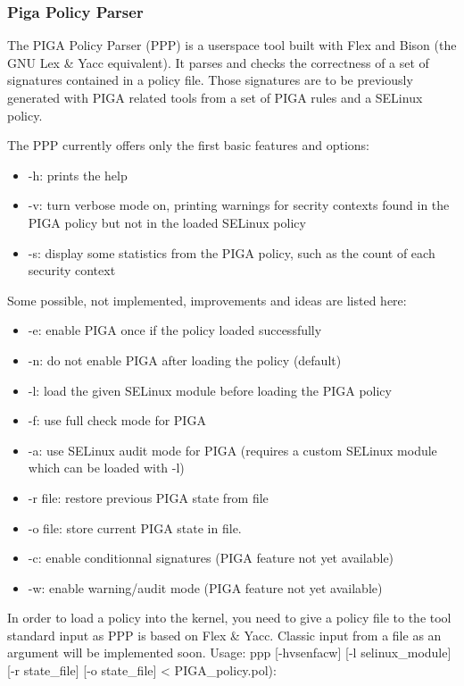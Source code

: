 \documentclass[pdftex,a4paper,titlepage,11pt]{article}
\begin{document}
\subsubsection{Piga Policy Parser}

The PIGA Policy Parser (PPP) is a userspace tool built with Flex and Bison (the
GNU Lex \& Yacc equivalent). It parses and checks the correctness of a set of
signatures contained in a policy file. Those signatures are to be previously
generated with PIGA related tools from a set of PIGA rules and a SELinux policy.

The PPP currently offers only the first basic features and options:
\begin{itemize}
	\item -h: prints the help
	\item -v: turn verbose mode on, printing warnings for secrity contexts found
in the PIGA policy but not in the loaded SELinux policy
	\item -s: display some statistics from the PIGA policy, such as the count of
each security context
\end{itemize}

\smallskip

Some possible, not implemented, improvements and ideas are listed here:
\begin{itemize}
	\item -e: enable PIGA once if the policy loaded successfully
	\item -n: do not enable PIGA after loading the policy (default)
	\item -l: load the given SELinux module before loading the PIGA policy
	\item -f: use full check mode for PIGA
	\item -a: use SELinux audit mode for PIGA (requires a custom SELinux module
which can be loaded with -l)
	\item -r file: restore previous PIGA state from file
	\item -o file: store current PIGA state in file.
	\item -c: enable conditionnal signatures (PIGA feature not yet available)
	\item -w: enable warning/audit mode (PIGA feature not yet available)
\end{itemize}

\smallskip

In order to load a policy into the kernel, you need to give a policy file to the
tool standard input as PPP is based on Flex \& Yacc. Classic input from a file
as an argument will be implemented soon. Usage: ppp [-hvsenfacw] [-l
selinux\_module] [-r state\_file] [-o state\_file] < PIGA\_policy.pol):
\end{document}
